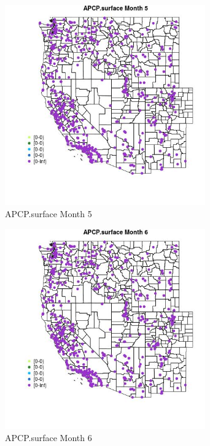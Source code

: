 \begin{figure} 
\centering  
\includegraphics[width=0.77\textwidth]{Code_Outputs/Report_ML_input_PM25_Step4_part_e_de_duplicated_aves_compiled_2019-05-14wNAs_MapObsMo5APCPsurface.jpg} 
\caption{\label{fig:Report_ML_input_PM25_Step4_part_e_de_duplicated_aves_compiled_2019-05-14wNAsMapObsMo5APCPsurface}APCP.surface Month 5} 
\end{figure} 
 

\begin{figure} 
\centering  
\includegraphics[width=0.77\textwidth]{Code_Outputs/Report_ML_input_PM25_Step4_part_e_de_duplicated_aves_compiled_2019-05-14wNAs_MapObsMo6APCPsurface.jpg} 
\caption{\label{fig:Report_ML_input_PM25_Step4_part_e_de_duplicated_aves_compiled_2019-05-14wNAsMapObsMo6APCPsurface}APCP.surface Month 6} 
\end{figure} 
 


